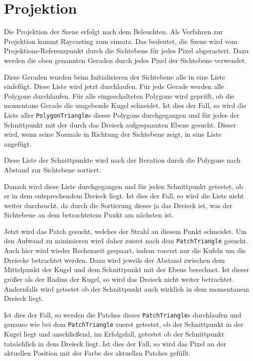 \documentclass[final,a4paper,11pt,notitlepage,halfparskip]{scrreprt}
\begin{document}
\section{Projektion}\label{sec:proj}

Die Projektion der Szene erfolgt nach dem Beleuchten. Als Verfahren zur
Projektion kommt Raycasting zum einsatz. Das bedeutet, die Szene wird vom
Projektions-Referenzpunkt durch die Sichtebene für jedes Pixel abgerastert. Dazu
werden die oben genannten Geraden durch jedes Pixel der Sichtebene verwendet.

Diese Geraden wurden beim Initialisieren der Sichtebene alle in eine Liste
einfefügt. Diese Liste wird jetzt durchlaufen. Für jede Gerade werden alle
Polygone durchlaufen. Für alle eingeschalteten Polygone wird geprüft, ob die
momentane Gerade die umgebende Kugel schneidet.  Ist dies der Fall, so wird die
Liste aller \texttt{PolygonTriangle}s dieses Polygons durchgegangen und für
jedes der Schnittpunkt mit der durch das Dreieck aufgespannten Ebene gesucht.
Dieser wird, wenn seine Normale in Richtung der Sichtebene zeigt, in eine Liste
angefügt. 

Diese Liste der Schnittpunkte wird nach der Iteration durch die Polygone nach
Abstand zur Sichtebene sortiert.

Danach wird diese Liste durchgegangen und für jeden Schnittpunkt getestet, ob
er in dem entsprechendem Dreieck liegt. Ist dies der Fall, so wird die Liste
nicht weiter durchsucht, da durch die Sortierung dieses ja das Dreieck ist, was
der Sichtebene an dem betrachtetem Punkt am nächsten ist.

Jetzt wird das Patch gesucht, welches der Strahl an diesem Punkt schneidet. Um
den Aufwand zu minimieren wird daher zuerst nach dem \texttt{PatchTriangle}
gesucht. Auch hier wird wieder Rechenzeit gespaart, indem vorerst nur die Kufeln
um die Dreiecke betrachtet werden. Dazu wird jeweils der Abstand zwischen dem
Mittelpunkt der Kugel und dem Schnittpunkt mit der Ebene berechnet. Ist dieser
größer als der Radius der Kugel, so wird das Dreieck nicht weiter betrachtet. 
Andernfalls wird getestet ob der Schnittpunkt auch wirklich in dem momentanem
Dreieck liegt.

Ist dies der Fall, so werden die Patches dieses \texttt{PatchTriangle}s
durchlaufen und genauso wie bei dem \texttt{PatchTriangle} zuerst getestet, ob
der Schnittpunkt in der Kugel liegt und anschließend, im Erfolgsfall, getestet
ob der Schnittpunkt tatsächlich in dem Dreieck liegt. Ist dies der Fall, so wird
das Pixel an der aktuellen Position mit der Farbe des aktuellen Patches gefüllt.
\end{document}
